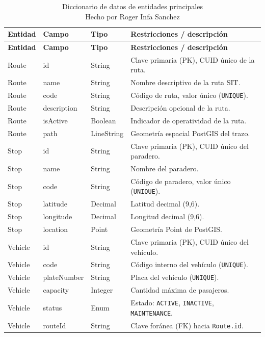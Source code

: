 \begin{longtable}{|p{}|p{}|p{}|p{}|}
\caption{Diccionario de datos de entidades principales\\Hecho por Roger Infa Sanchez} \\
\hline
\textbf{Entidad} & \textbf{Campo} & \textbf{Tipo} & \textbf{Restricciones / descripción} \\
\hline
\endfirsthead
\hline
\textbf{Entidad} & \textbf{Campo} & \textbf{Tipo} & \textbf{Restricciones / descripción} \\
\hline
\endhead
Route & id & String & Clave primaria (PK), CUID único de la ruta. \\
\hline
Route & name & String & Nombre descriptivo de la ruta SIT. \\
\hline
Route & code & String & Código de ruta, valor único (\texttt{UNIQUE}). \\
\hline
Route & description & String & Descripción opcional de la ruta. \\
\hline
Route & isActive & Boolean & Indicador de operatividad de la ruta. \\
\hline
Route & path & LineString & Geometría espacial PostGIS del trazo. \\
\hline
Stop & id & String & Clave primaria (PK), CUID único del paradero. \\
\hline
Stop & name & String & Nombre del paradero. \\
\hline
Stop & code & String & Código de paradero, valor único (\texttt{UNIQUE}). \\
\hline
Stop & latitude & Decimal & Latitud decimal (9,6). \\
\hline
Stop & longitude & Decimal & Longitud decimal (9,6). \\
\hline
Stop & location & Point & Geometría Point de PostGIS. \\
\hline
Vehicle & id & String & Clave primaria (PK), CUID único del vehículo. \\
\hline
Vehicle & code & String & Código interno del vehículo (\texttt{UNIQUE}). \\
\hline
Vehicle & plateNumber & String & Placa del vehículo (\texttt{UNIQUE}). \\
\hline
Vehicle & capacity & Integer & Cantidad máxima de pasajeros. \\
\hline
Vehicle & status & Enum & Estado: \texttt{ACTIVE}, \texttt{INACTIVE}, \texttt{MAINTENANCE}. \\
\hline
Vehicle & routeId & String & Clave foránea (FK) hacia \texttt{Route.id}. \\

\end{longtable}
